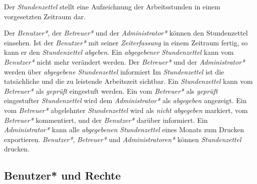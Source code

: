 \begin{requirements}
    Der \emph{Stundenzettel} stellt eine Aufzeichnung der Arbeitsstunden in einem vorgesetzten Zeitraum dar.
    \begin{requirements}
         Der \emph{Benutzer*}, der \emph{Betreuer*} und der \emph{Administrator*} können den Stundenzettel einsehen.
         Ist der \emph{Benutzer*} mit seiner \emph{Zeiterfassung} in einem Zeitraum fertig, so kann er den \emph{Stundenzettel abgeben}.
         Ein \emph{abgegebener Stundenzettel} kann vom \emph{Benutzer*} nicht mehr verändert werden.
         Der \emph{Betreuer*} und der \emph{Administrator*} werden über \emph{abgegebene Stundenzettel} informiert
         Im \emph{Stundenzettel} ist die tatsächliche und die zu leistende Arbeitszeit sichtbar.
         Ein \emph{Stundenzettel} kann vom \emph{Betreuer*} als \emph{geprüft} eingestuft werden.
         Ein vom \emph{Betreuer*} als \emph{geprüft} eingestufter \emph{Stundenzettel} wird dem \emph{Administrator*} als \emph{abgegeben} angezeigt.
         Ein vom \emph{Betreuer*} abgelehnter \emph{Stundenzettel} wird als \emph{nicht abgegeben} markiert, vom \emph{Betreuer*} kommentiert, und der \emph{Benutzer*} darüber informiert.
         Ein \emph{Administrator*} kann alle \emph{abgegebenen Stundenzettel} eines Monats zum Drucken exportieren.
        \emph{Benutzer*}, \emph{Betreuer*} und \emph{Administratoren*} können \emph{Stundenzettel} drucken.
    \end{requirements}

\end{requirements}

\subsection{Benutzer* und Rechte}

